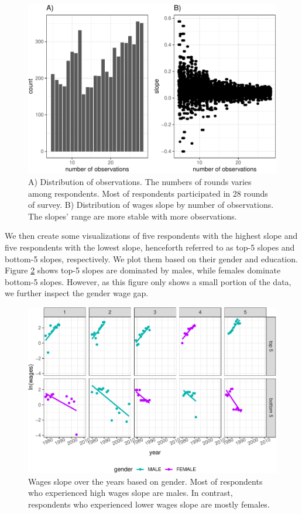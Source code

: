 \documentclass{article}
\begin{document}
\begin{figure}

{\centering \includegraphics[width=468px]{figures/slope-nobs-plot-1} 

}

\caption{A) Distribution of observations. The numbers of rounds varies among respondents. Most of respondents participated in 28 rounds of survey. B) Distribution of wages slope by number of observations. The slopes' range are more stable with more observations.}\label{fig:slope-nobs-plot}
\end{figure}

We then create some visualizations of five respondents with the highest slope and five respondents with the lowest slope, henceforth referred to as top-5 slopes and bottom-5 slopes, respectively. We plot them based on their gender and education. Figure \ref{fig:slope-gender} shows top-5 slopes are dominated by males, while females dominate bottom-5 slopes. However, as this figure only shows a small portion of the data, we further inspect the gender wage gap.

\begin{figure}

{\centering \includegraphics[width=468px]{figures/slope-gender-1} 

}

\caption{Wages slope over the years based on gender. Most of respondents who experienced high wages slope are males. In contrast, respondents who experienced lower wages slope are mostly females.}\label{fig:slope-gender}
\end{figure}
\end{document}
